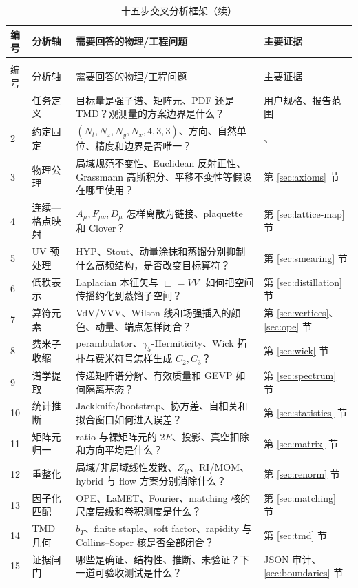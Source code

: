 \documentclass[UTF8,11pt,oneside]{ctexbook}
\begin{document}
\begin{longtable}{@{}P{0.08\textwidth}P{0.22\textwidth}P{0.34\textwidth}P{0.25\textwidth}@{}}
\caption{十五步交叉分析框架：从输入约定到证据闭环}\label{tab:fifteen-steps}\\
\toprule
编号 & 分析轴 & 需要回答的物理/工程问题 & 主要证据\\
\midrule
\endfirsthead
\caption[]{十五步交叉分析框架（续）}\\
\toprule
编号 & 分析轴 & 需要回答的物理/工程问题 & 主要证据\\
\midrule
\endhead
\bottomrule
{} & 任务定义 & 目标量是强子谱、矩阵元、PDF 还是 TMD？观测量的方案边界是什么？ & 用户规格、报告范围\\
2 & 约定固定 & \((N_t,N_z,N_y,N_x,4,3,3)\)、方向、自然单位、精度和边界是否唯一？ & 、\\
3 & 物理公理 & 局域规范不变性、Euclidean 反射正性、Grassmann 高斯积分、平移不变性等假设在哪里使用？ & 第 \ref{sec:axioms} 节\\
4 & 连续—格点映射 & \(A_\mu,F_{\mu\nu},D_\mu\) 怎样离散为链接、plaquette 和 Clover？ & 第 \ref{sec:lattice-map} 节\\
5 & UV 预处理 & HYP、Stout、动量涂抹和蒸馏分别抑制什么高频结构，是否改变目标算符？ & 第 \ref{sec:smearing} 节\\
6 & 低秩表示 & Laplacian 本征矢与 \(\Box=VV^\dagger\) 如何把空间传播约化到蒸馏子空间？ & 第 \ref{sec:distillation} 节\\
7 & 算符元素 & VdV/VVV、Wilson 线和场强插入的颜色、动量、端点怎样闭合？ & 第 \ref{sec:vertices}、\ref{sec:ope} 节\\
8 & 费米子收缩 & perambulator、\(\gamma_5\)-Hermiticity、Wick 拓扑与费米符号怎样生成 \(C_2,C_3\)？ & 第 \ref{sec:wick} 节\\
9 & 谱学提取 & 传递矩阵谱分解、有效质量和 GEVP 如何隔离基态？ & 第 \ref{sec:spectrum} 节\\
10 & 统计推断 & Jackknife/bootstrap、协方差、自相关和拟合窗口如何进入误差？ & 第 \ref{sec:statistics} 节\\
11 & 矩阵元归一 & ratio 与裸矩阵元的 \(2E\)、投影、真空扣除和方向平均是什么？ & 第 \ref{sec:matrix} 节\\
12 & 重整化 & 局域/非局域线性发散、\(Z_R\)、RI/MOM、hybrid 与 flow 方案分别消除什么？ & 第 \ref{sec:renorm} 节\\
13 & 因子化匹配 & OPE、LaMET、Fourier、matching 核的尺度层级和卷积测度是什么？ & 第 \ref{sec:matching} 节\\
14 & TMD 几何 & \(b_T\)、finite staple、soft factor、rapidity 与 Collins--Soper 核是否全部闭合？ & 第 \ref{sec:tmd} 节\\
15 & 证据闸门 & 哪些是确证、结构性、推断、未验证？下一道可验收测试是什么？ & JSON 审计、\ref{sec:boundaries} 节\\
\end{longtable}
\end{document}
